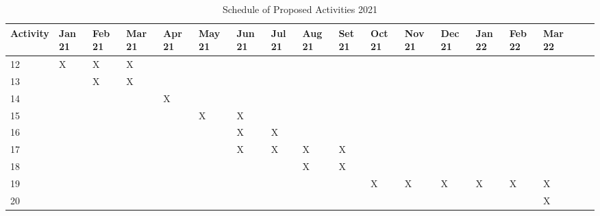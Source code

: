 \begin{table}[htbp]
\tiny
\begin{flushleft}
\begin{tabular}{|p{1cm}|p{0.4cm}|p{0.4cm}|p{0.4cm}|p{0.4cm}|p{0.4cm}|p{0.4cm}|p{0.4cm}|p{0.4cm}|p{0.4cm}|p{0.4cm}|p{0.4cm}|p{0.4cm}|p{0.4cm}|p{0.4cm}|p{0.4cm}|p{0.4cm}|p{0.4cm}|}
\hline
\textbf{Activity}& \textbf{Jan 21}&	\textbf{Feb 21}&	\textbf{Mar 21}&\textbf{Apr 21}&	\textbf{May 21}&	\textbf{Jun 21}&	\textbf{Jul 21}&	\textbf{Aug 21}&	\textbf{Set 21}&	\textbf{Oct 21}&	\textbf{Nov 21}&	\textbf{Dec 21}&	\textbf{Jan 22}&	\textbf{Feb 22}&	\textbf{Mar 22}\\
\hline	12 	& X& X& X&  &  &  &  &  &  &  &  &  &  &  &  \\
\hline	13  &  & X& X&  &  &  &  &  &  &  &  &  	&  &  &  \\
\hline	14 	&  &  &  & X&  &  &  &  &  &  &  &  &	  &  &  \\

\hline	15 	&  &  &  &  & X& X&  &  &  &  &  &  &	  &  &  \\
\hline	16 	&  &  &  &  &  & X& X&  &  &  &  &  &	  &  &  \\
\hline	17 	&  &  &  &  &  & X& X& X& X& &  &  &	  &  &  \\
\hline	18 	&  &  &  &  &  &  &  & X& X& &  &  &	  &  &  \\
\hline	19 	&  &  &  &  &  &  &  &  &  & X& X& X&	 X &X &X \\
\hline	20 	&  &  &  &  &  &  &  &  &  &  &  &  &	  &  &X \\


\hline
\end{tabular}
\end{flushleft}
\caption{Schedule of Proposed Activities 2021}
\label{tb:schedule2}
\end{table}



